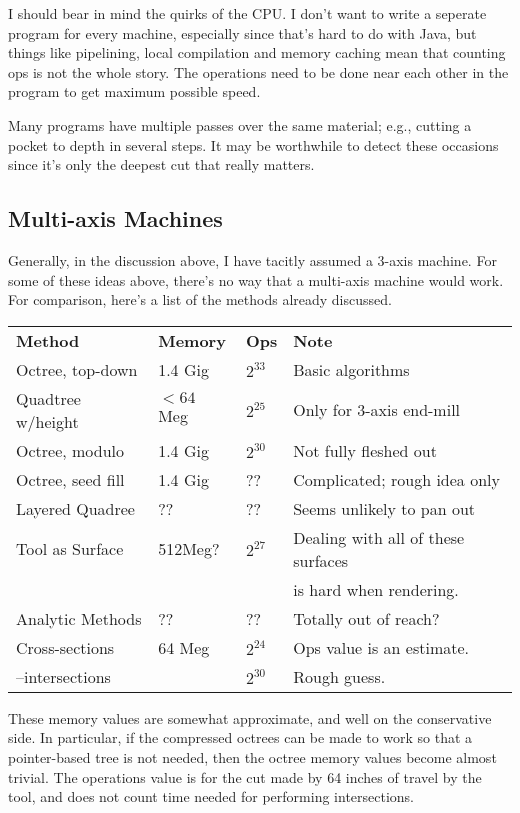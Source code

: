 \documentclass[titlepage,oneside,10pt]{article}
\begin{document}
I should bear in mind the quirks of the CPU. I don't want to write a
seperate program for every machine, especially since that's hard to do
with Java, but things like pipelining, local compilation and memory
caching mean that counting ops is not the whole story. The operations
need to be done near each other in the program to get maximum possible
speed.

Many programs have multiple passes over the same material; e.g.,
cutting a pocket to depth in several steps. It may be worthwhile to
detect these occasions since it's only the deepest cut that really
matters. 

\subsection{Multi-axis Machines}

Generally, in the discussion above, I have tacitly assumed a 3-axis
machine. For some of these ideas above, there's no way that a
multi-axis machine would work. For comparison, here's a list of the
methods already discussed.
\vskip 0.25cm
\begin{tabular}{llll}
\bf{Method}&\bf{Memory}&\bf{Ops}&\bf{Note}\\
Octree, top-down & 1.4 Gig &$2^{33}$&Basic algorithms\\
Quadtree w/height&$<64$ Meg&$2^{25}$&Only for 3-axis end-mill\\
Octree, modulo   & 1.4 Gig &$2^{30}$&Not fully fleshed out\\
Octree, seed fill& 1.4 Gig &??      &Complicated; rough idea only\\
Layered Quadree  &??       &??      &Seems unlikely to pan out\\
Tool as Surface  &512Meg?  &$2^{27}$&Dealing with all of these surfaces\\
                 &         &        & is hard when rendering.\\
Analytic Methods &??       &??      &Totally out of reach?\\
Cross-sections   &64 Meg   &$2^{24}$&Ops value is an estimate.\\
\quad--intersections&      &$2^{30}$&Rough guess.\\
\end{tabular}
\vskip 0.25cm

These memory values are somewhat approximate, and well on the
conservative side. In particular, if the compressed octrees can be
made to work so that a pointer-based tree is not needed, then the
octree memory values become almost trivial. The operations value is
for the cut made by 64 inches of travel by the tool, and does not
count time needed for performing intersections.
\end{document}
